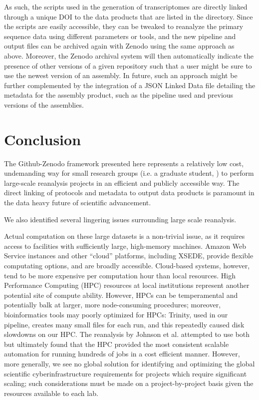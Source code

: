 \documentclass[12pt]{article}
\begin{document}
As such, the scripts used in the generation of transcriptomes are
directly linked through a unique DOI to the data products that are
listed in the directory. Since the scripts are easily accessible, they
can be tweaked to reanalyze the primary sequence data using different
parameters or tools, and the new pipeline and output files can be
archived again with Zenodo using the same approach as above.
Moreover, the Zenodo archival system will then automatically indicate
the presence of other versions of a given repository such that a user
might be sure to use the newest version of an assembly. In future,
such an approach might be further complemented by the integration of a
JSON Linked Data file detailing the metadata for the assembly product,
such as the pipeline used and previous versions of the assemblies.

\section{Conclusion}

The Github-Zenodo framework presented here represents a relatively low
cost, undemanding way for small research groups (i.e. a graduate
student, ) to perform large-scale reanalysis projects in an efficient
and publicly accessible way. The direct linking of protocols and
metadata to output data products is paramount in the data heavy future
of scientific advancement.

We also identified several lingering issues surrounding large scale
reanalysis.

Actual computation on these large datasets is a non-trivial issue, as
it requires access to facilities with sufficiently large, high-memory
machines.  Amazon Web Service instances and other ``cloud'' platforms,
including XSEDE, provide flexible computating options, and are broadly
accessible. Cloud-based systems, however, tend to be more expensive
per computation hour than local resources. High Performance Computing
(HPC) resources at local institutions represent another potential site
of compute ability.  However, HPCs can be temperamental and
potentially balk at larger, more node-consuming procedures; moreover,
bioinformatics tools may poorly optimized for HPCs: Trinity, used in
our pipeline, creates many small files for each run, and this
repeatedly caused disk slowdowns on our HPC.  The reanalysis by
Johnson et al. \cite{Johnson2018} attempted to use both but ultimately
found that the HPC provided the most consistent scalable automation
for running hundreds of jobs in a cost efficient manner.  However,
more generally, we see no global solution for identifying and
optimizing the global scientific cyberinfrastructure requirements for
projects which require significant scaling; such considerations must
be made on a project-by-project basis given the resources available to
each lab.
\end{document}
